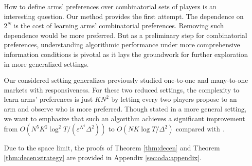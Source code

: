 How to define arms' preferences over combinatorial sets of players is an interesting question. 
Our method provides the first attempt. 
The dependence on $2^N$ is the cost of learning arms' combinatorial preferences. 
Removing such dependence would be more preferred. 
But as a preliminary step for combinatorial preferences, understanding algorithmic performance under more comprehensive information conditions is pivotal as it lays the groundwork for further exploration in more generalized settings.


Our considered setting generalizes previously studied one-to-one and many-to-one markets with responsiveness.
For these two reduced settings, the complexity to learn arms' preferences is just $KN^2$ by letting every two players propose to an arm and observe who is more preferred. Though stated in a more general setting, we want to emphasize that such an algorithm achieves a significant improvement from $O(N^5K^2 \log^2 T/(\varepsilon^{N^4}\Delta^2))$ to $O(NK\log T/\Delta^2)$ compared with \citet{wang2022bandit}. 

Due to the space limit, the proofs of Theorem \ref{thm:decen} and Theorem \ref{thm:decen:strategy} are provided in Appendix \ref{sec:oda:appendix}.  











 




















